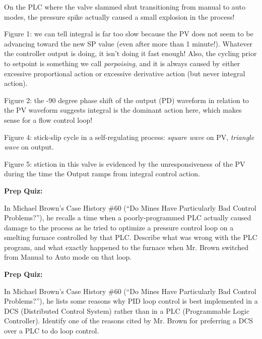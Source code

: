 \vskip 10pt

On the PLC where the valve slammed shut transitioning from manual to auto modes, the pressure spike actually caused a small explosion in the process!

\vskip 10pt

Figure 1: we can tell integral is far too slow because the PV does not seem to be advancing toward the new SP value (even after more than 1 minute!).  Whatever the controller output is doing, it isn't doing it fast enough!  Also, the cycling prior to setpoint is something we call {\it porpoising}, and it is always caused by either excessive proportional action or excessive derivative action (but never integral action).

\vskip 10pt

Figure 2: the -90 degree phase shift of the output (PD) waveform in relation to the PV waveform suggests integral is the dominant action here, which makes sense for a flow control loop!

\vskip 10pt

Figure 4: stick-slip cycle in a self-regulating process: {\it square wave} on PV, {\it triangle wave} on output.

\vskip 10pt

Figure 5: stiction in this valve is evidenced by the unresponsiveness of the PV during the time the Output ramps from integral control action.










\vfil \eject

\noindent
{\bf Prep Quiz:}

In Michael Brown's Case History \#60 (``Do Mines Have Particularly Bad Control Problems?''), he recalls a time when a poorly-programmed PLC actually caused damage to the process as he tried to optimize a pressure control loop on a smelting furnace controlled by that PLC.  Describe what was wrong with the PLC program, and what exactly happened to the furnace when Mr. Brown switched from Manual to Auto mode on that loop.










\vfil \eject

\noindent
{\bf Prep Quiz:}

In Michael Brown's Case History \#60 (``Do Mines Have Particularly Bad Control Problems?''), he lists some reasons why PID loop control is best implemented in a DCS (Distributed Control System) rather than in a PLC (Programmable Logic Controller).  Identify one of the reasons cited by Mr. Brown for preferring a DCS over a PLC to do loop control.





